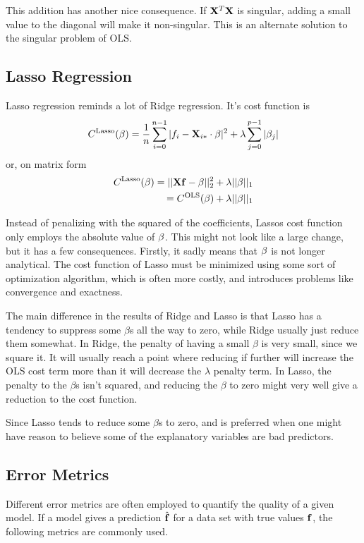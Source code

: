 \documentclass[10pt, twocolumn]{article}
\begin{document}
This addition has another nice consequence. If $\vb{X}^T \vb{X}$ is singular, adding a small value to the diagonal will make it non-singular. This is an alternate solution to the singular problem of OLS.



\subsection{Lasso Regression}
\label{subsec:Lasso}
Lasso regression reminds a lot of Ridge regression. It's cost function is 
\begin{align}
    C^\text{Lasso}(\beta) = \frac{1}{n}\sum\limits_{i=0}^{n-1}|f_i - \vb{X}_{i\ast}\cdot \vb{\beta}|^2 + \lambda \sum\limits_{j=0}^{p-1}|\beta_j|
\end{align}
or, on matrix form
\begin{align}
    C^\text{Lasso}(\vb{\beta}) = ||\vb{X} \vb{f} - \vb{\beta} ||^2_2 + \lambda||\vb{\beta}||_1 \\
    = C^\text{OLS}(\vb{\beta}) + \lambda||\vb{\beta}||_1
\end{align}

Instead of penalizing with the squared of the coefficients, Lassos cost function only employs the absolute value of $\vb{\beta}$. This might not look like a large change, but it has a few consequences. Firstly, it sadly means that $\vb{\beta}$ is not longer analytical. The cost function of Lasso must be minimized using some sort of optimization algorithm, which is often more costly, and introduces problems like convergence and exactness.

The main difference in the results of Ridge and Lasso is that Lasso has a tendency to suppress some $\beta$s all the way to zero, while Ridge usually just reduce them somewhat. In Ridge, the penalty of having a small $\beta$ is very small, since we square it. It will usually reach a point where reducing if further will increase the OLS cost term more than it will decrease the $\lambda$ penalty term. In Lasso, the penalty to the $\beta$s isn't squared, and reducing the $\beta$ to zero might very well give a reduction to the cost function.

Since Lasso tends to reduce some $\beta$s to zero, and is preferred when one might have reason to believe some of the explanatory variables are bad predictors.


\subsection{Error Metrics}
\label{subsec:method_errormetrics}
Different error metrics are often employed to quantify the quality of a given model. If a model gives a prediction $\hat{\vb{f}}$ for a data set with true values $\vb{f}$, the following metrics are commonly used.
\end{document}

